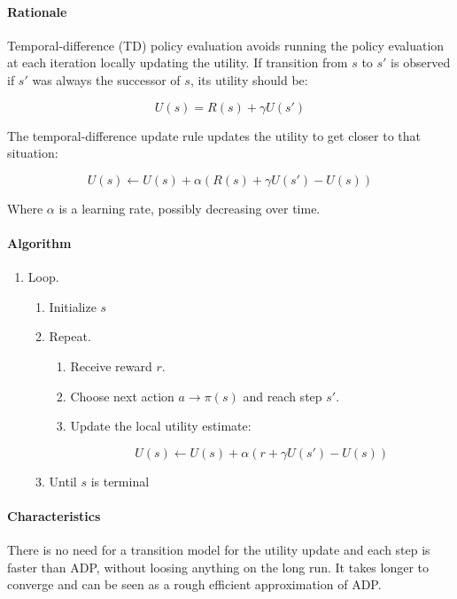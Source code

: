 			\paragraph{Rationale}
			Temporal-difference (TD) policy evaluation avoids running the policy evaluation at each iteration locally updating the utility.
			If transition from $s$ to $s'$ is observed if $s'$ was always the successor of $s$, its utility should be:

			$$U(s) = R(s) + \gamma U(s')$$

			The temporal-difference update rule updates the utility to get closer to that situation:

			$$U(s)\leftarrow U(s) + \alpha(R(s)+\gamma U(s')-U(s))$$

			Where $\alpha$ is a learning rate, possibly decreasing over time.

			\paragraph{Algorithm}

			\begin{enumerate}
				\item Loop.

					\begin{enumerate}
						\item Initialize $s$
						\item Repeat.

							\begin{enumerate}
								\item Receive reward $r$.
								\item Choose next action $a\rightarrow \pi(s)$ and reach step $s'$.
								\item Update the local utility estimate:

									$$U(s)\leftarrow U(s) + \alpha(r+\gamma U(s')-U(s))$$

							\end{enumerate}

						\item Until $s$ is terminal
					\end{enumerate}

			\end{enumerate}

			\paragraph{Characteristics}
			There is no need for a transition model for the utility update and each step is faster than ADP, without loosing anything on the long run.
			It takes longer to converge and can be seen as a rough efficient approximation of ADP.

